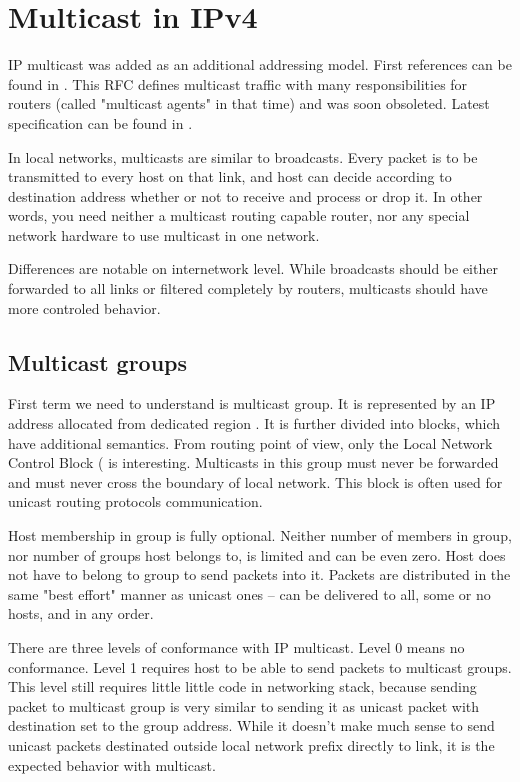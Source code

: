 \chapter{Multicast in IPv4}

IP multicast was added as an additional addressing model. First
references can be found in . This RFC defines multicast traffic
with many responsibilities for routers (called "multicast agents" in that time)
and was soon obsoleted. Latest specification can be found in .

In local networks, multicasts are similar to broadcasts. Every packet is to be
transmitted to every host on that link, and host can decide according to
destination address whether or not to receive and process or drop it. In other
words, you need neither a multicast routing capable router, nor any special
network hardware to use multicast in one network.

Differences are notable on internetwork level. While broadcasts should be
either forwarded to all links or filtered completely by routers, multicasts
should have more controled behavior.

\section{Multicast groups}

First term we need to understand is multicast group. It is represented by an IP
address allocated from dedicated region . It is further
divided into blocks, which have additional semantics. From routing point of
view, only the Local Network Control Block ( is
interesting. Multicasts in this group must never be forwarded and must never
cross the boundary of local network. This block is often used for unicast
routing protocols communication.

Host membership in group is fully optional. Neither number of members in group,
nor number of groups host belongs to, is limited and can be even zero. Host
does not have to belong to group to send packets into it. Packets are
distributed in the same "best effort" manner as unicast ones -- can be
delivered to all, some or no hosts, and in any order.

There are three levels of conformance with IP multicast. Level 0 means no
conformance. Level 1 requires host to be able to send packets to multicast
groups. This level still requires little little code in networking stack, because
sending packet to multicast group is very similar to sending it as unicast
packet with destination set to the group address. While it doesn't make much
sense to send unicast packets destinated outside local network prefix directly
to link, it is the expected behavior with multicast.

